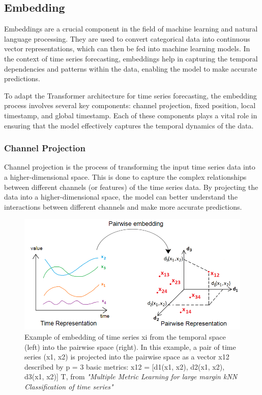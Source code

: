 \subsection{Embedding}
Embeddings are a crucial component in the field of machine learning and natural language processing. They are used to convert categorical data into continuous vector representations, which can then be fed into machine learning models. In the context of time series forecasting, embeddings help in capturing the temporal dependencies and patterns within the data, enabling the model to make accurate predictions.

To adapt the Transformer architecture for time series forecasting, the embedding process involves several key components: channel projection, fixed position, local timestamp, and global timestamp. Each of these components plays a vital role in ensuring that the model effectively captures the temporal dynamics of the data.

\subsubsection{Channel Projection}
Channel projection is the process of transforming the input time series data into a higher-dimensional space. This is done to capture the complex relationships between different channels (or features) of the time series data. By projecting the data into a higher-dimensional space, the model can better understand the interactions between different channels and make more accurate predictions.
\begin{figure}[htbp]
    \centering
    \includegraphics[width=13cm]{3_ChapterTranformerVariants/figuras/ChannelProjection.png}
    \caption{Example of embedding of time series xi from the temporal space (left) into the pairwise space (right). In this example, a pair of time series (x1, x2) is projected into the pairwise space as a vector x12 described by p = 3 basic metrics: x12 = [d1(x1, x2), d2(x1, x2), d3(x1, x2)] T, from \textit{"Multiple Metric Learning for large margin kNN Classification of time series"} \cite{inproceedings}}
    \end{figure}

